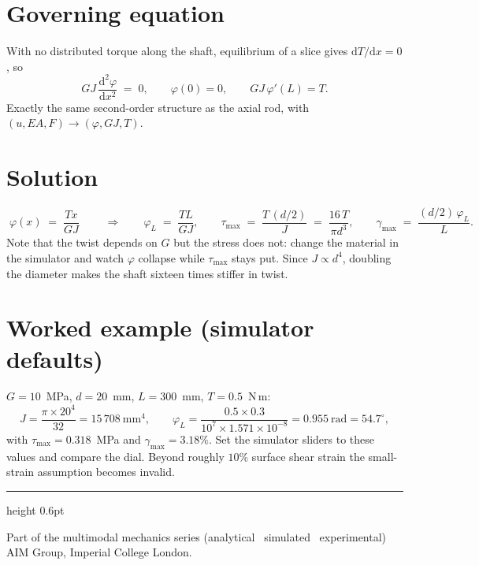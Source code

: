 \documentclass[10pt,a4paper]{article}
\begin{document}
\section*{Governing equation}
With no distributed torque along the shaft, equilibrium of a slice gives
$\mathrm{d}T/\mathrm{d}x = 0$, so
\begin{equation}
G J \,\frac{\mathrm{d}^2 \varphi}{\mathrm{d}x^2} \;=\; 0,
\qquad
\varphi(0) = 0, \qquad G J\,\varphi'(L) = T .
\end{equation}
Exactly the same second-order structure as the axial rod, with
$(u, EA, F) \rightarrow (\varphi, GJ, T)$.

\section*{Solution}
\begin{equation}
\boxed{\; \varphi(x) \;=\; \frac{T x}{G J} \;}
\qquad\Rightarrow\qquad
\varphi_L \;=\; \frac{T L}{G J},
\qquad
\tau_{\max} \;=\; \frac{T\,(d/2)}{J} \;=\; \frac{16\,T}{\pi d^3},
\qquad
\gamma_{\max} \;=\; \frac{(d/2)\,\varphi_L}{L}.
\end{equation}
Note that the twist depends on $G$ but the stress does not: change the material
in the simulator and watch $\varphi$ collapse while $\tau_{\max}$ stays put.
Since $J \propto d^4$, doubling the diameter makes the shaft sixteen times
stiffer in twist.

\section*{Worked example (simulator defaults)}
$G = 10$~MPa, $d = 20$~mm, $L = 300$~mm, $T = 0.5$~N\,m:
\begin{equation}
J = \frac{\pi \times 20^4}{32} = 15\,708~\text{mm}^4, \qquad
\varphi_L = \frac{0.5 \times 0.3}{10^7 \times 1.571\times10^{-8}}
= 0.955~\text{rad} = 54.7^\circ,
\end{equation}
with $\tau_{\max} = 0.318$~MPa and $\gamma_{\max} = 3.18\%$. Set the simulator
sliders to these values and compare the dial. Beyond roughly $10\%$ surface shear
strain the small-strain assumption becomes invalid.

\vfill
{\color{celline}\hrule height 0.6pt}
\smallskip
{\footnotesize\textcolor{celdark}{Part of the multimodal mechanics series
(analytical \textperiodcentered\ simulated \textperiodcentered\ experimental)
\,\textperiodcentered\, AIM Group, Imperial College London.}}
\end{document}
